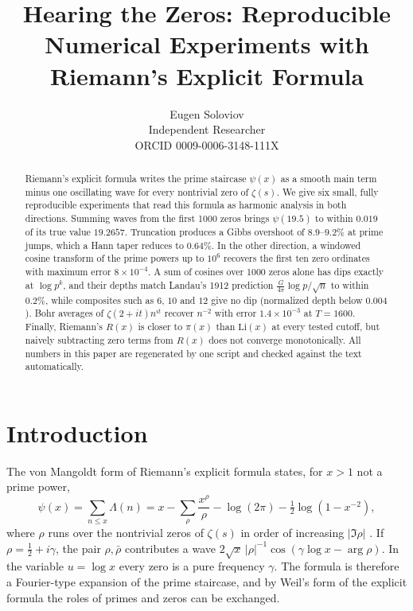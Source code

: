 \documentclass[11pt]{article}
\title{Hearing the Zeros: Reproducible Numerical Experiments with Riemann's Explicit Formula}
\author{Eugen Soloviov\\Independent Researcher\\ORCID 0009-0006-3148-111X}
\date{}
\begin{document}
\maketitle

\begin{abstract}
Riemann's explicit formula writes the prime staircase $\psi(x)$ as a smooth main term minus one oscillating wave for every nontrivial zero of $\zeta(s)$. We give six small, fully reproducible experiments that read this formula as harmonic analysis in both directions. Summing waves from the first 1000 zeros brings $\psi(19.5)$ to within $0.019$ of its true value $19.2657$. Truncation produces a Gibbs overshoot of $8.9$--$9.2\%$ at prime jumps, which a Hann taper reduces to $0.64\%$. In the other direction, a windowed cosine transform of the prime powers up to $10^6$ recovers the first ten zero ordinates with maximum error $8\times10^{-4}$. A sum of cosines over 1000 zeros alone has dips exactly at $\log p^k$, and their depths match Landau's 1912 prediction $\tfrac{G}{4\pi}\log p/\sqrt{n}$ to within $0.2\%$, while composites such as $6$, $10$ and $12$ give no dip (normalized depth below $0.004$). Bohr averages of $\zeta(2+it)n^{it}$ recover $n^{-2}$ with error $1.4\times10^{-3}$ at $T=1600$. Finally, Riemann's $R(x)$ is closer to $\pi(x)$ than $\mathrm{Li}(x)$ at every tested cutoff, but naively subtracting zero terms from $R(x)$ does not converge monotonically. All numbers in this paper are regenerated by one script and checked against the text automatically.
\end{abstract}

\section{Introduction}

The von Mangoldt form of Riemann's explicit formula states, for $x>1$ not a prime power,
\begin{equation}
\psi(x)=\sum_{n\le x}\Lambda(n)=x-\sum_{\rho}\frac{x^{\rho}}{\rho}-\log(2\pi)-\tfrac12\log(1-x^{-2}),
\label{eq:explicit}
\end{equation}
where $\rho$ runs over the nontrivial zeros of $\zeta(s)$ in order of increasing $|\Im\rho|$ \cite{mazurstein2016,kedlaya-ant}. If $\rho=\tfrac12+i\gamma$, the pair $\rho,\bar\rho$ contributes a wave $2\sqrt{x}\,|\rho|^{-1}\cos(\gamma\log x-\arg\rho)$. In the variable $u=\log x$ every zero is a pure frequency $\gamma$. The formula is therefore a Fourier-type expansion of the prime staircase, and by Weil's form of the explicit formula \cite{weil1952} the roles of primes and zeros can be exchanged.
\end{document}
